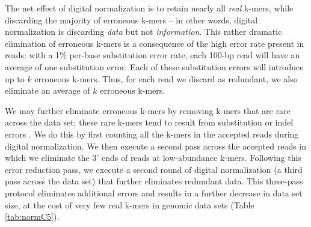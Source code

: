 \documentclass{pnastwo}
\begin{document}
\begin{article}
The net effect of digital normalization is to retain nearly all {\em
  real} k-mers, while discarding the majority of erroneous k-mers --
in other words, digital normalization is discarding {\em data} but not
{\em information}.  This rather dramatic elimination of erroneous
k-mers is a consequence of the high error rate present in reads: with
a 1\% per-base substitution error rate, each 100-bp read will have an
average of one substitution error. Each of these substitution errors
will introduce up to $k$ erroneous k-mers.  Thus, for each read we
discard as redundant, we also eliminate an average of $k$ erroneous
k-mers.

We may further eliminate erroneous k-mers by removing k-mers that are
rare across the data set; these rare k-mers tend to result from
substitution or indel errors \cite{pubmed21114842}.  We do this by
first counting all the k-mers in the accepted reads during digital
normalization.  We then execute a second pass across the accepted
reads in which we eliminate the 3' ends of reads at low-abundance
k-mers.  Following this error reduction pass, we execute a
second round of digital normalization (a third pass across the data
set) that further eliminates redundant data.  This three-pass protocol
eliminates additional errors and results in a further decrease in data
set size, at the cost of very few real k-mers in genomic data sets
(Table \ref{tab:normC5}).



\end{article}
\end{document}
